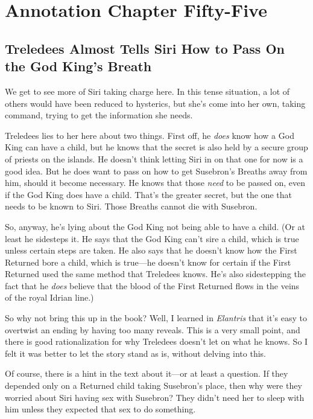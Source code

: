 \section{Annotation Chapter Fifty-Five}

\subsection*{Treledees Almost Tells Siri How to Pass On the God King’s Breath}

We get to see more of Siri taking charge here. In this tense situation, a lot of others would have been reduced to hysterics, but she’s come into her own, taking command, trying to get the information she needs.

Treledees lies to her here about two things. First off, he \textit{does} know how a God King can have a child, but he knows that the secret is also held by a secure group of priests on the islands. He doesn’t think letting Siri in on that one for now is a good idea. But he does want to pass on how to get Susebron’s Breaths away from him, should it become necessary. He knows that those \textit{need} to be passed on, even if the God King does have a child. That’s the greater secret, but the one that needs to be known to Siri. Those Breaths cannot die with Susebron.

So, anyway, he’s lying about the God King not being able to have a child. (Or at least he sidesteps it. He says that the God King can’t sire a child, which is true unless certain steps are taken. He also says that he doesn’t know how the First Returned bore a child, which is true—he doesn’t know for certain if the First Returned used the same method that Treledees knows. He’s also sidestepping the fact that he \textit{does} believe that the blood of the First Returned flows in the veins of the royal Idrian line.)

So why not bring this up in the book? Well, I learned in \textit{Elantris} that it’s easy to overtwist an ending by having too many reveals. This is a very small point, and there is good rationalization for why Treledees doesn’t let on what he knows. So I felt it was better to let the story stand as is, without delving into this.

Of course, there is a hint in the text about it—or at least a question. If they depended only on a Returned child taking Susebron’s place, then why were they worried about Siri having sex with Susebron? They didn’t need her to sleep with him unless they expected that sex to do something.


